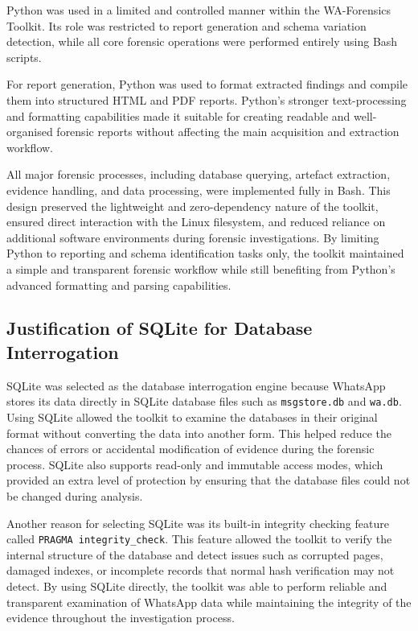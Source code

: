 \documentclass[12pt,a4paper]{report}
\begin{document}
Python was used in a limited and controlled manner within the WA-Forensics Toolkit. Its role was restricted to report generation and schema variation detection, while all core forensic operations were performed entirely using Bash scripts.

For report generation, Python was used to format extracted findings and compile them into structured HTML and PDF reports. Python's stronger text-processing and formatting capabilities made it suitable for creating readable and well-organised forensic reports without affecting the main acquisition and extraction workflow.

All major forensic processes, including database querying, artefact extraction, evidence handling, and data processing, were implemented fully in Bash. This design preserved the lightweight and zero-dependency nature of the toolkit, ensured direct interaction with the Linux filesystem, and reduced reliance on additional software environments during forensic investigations. By limiting Python to reporting and schema identification tasks only, the toolkit maintained a simple and transparent forensic workflow while still benefiting from Python's advanced formatting and parsing capabilities.

\subsection{Justification of SQLite for Database Interrogation}

SQLite was selected as the database interrogation engine because WhatsApp stores its data directly in SQLite database files such as \texttt{msgstore.db} and \texttt{wa.db}. Using SQLite allowed the toolkit to examine the databases in their original format without converting the data into another form. This helped reduce the chances of errors or accidental modification of evidence during the forensic process. SQLite also supports read-only and immutable access modes, which provided an extra level of protection by ensuring that the database files could not be changed during analysis.

Another reason for selecting SQLite was its built-in integrity checking feature called \texttt{PRAGMA integrity\_check}. This feature allowed the toolkit to verify the internal structure of the database and detect issues such as corrupted pages, damaged indexes, or incomplete records that normal hash verification may not detect. By using SQLite directly, the toolkit was able to perform reliable and transparent examination of WhatsApp data while maintaining the integrity of the evidence throughout the investigation process.
\end{document}
